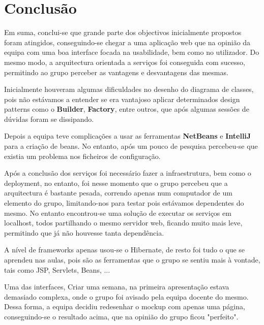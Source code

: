 \chapter{Conclusão}
\label{chap:conclusao}

\hspace{5mm} Em suma, conclui-se que grande parte dos objectivos inicialmente propostos foram atingidos, conseguindo-se chegar a uma aplicação web que na opinião da equipa com uma boa interface focada na usabilidade, bem como no utilizador. Do mesmo modo, a arquitectura orientada a serviços foi conseguida com sucesso, permitindo ao grupo perceber as vantagens e desvantagens das mesmas.

\hspace{5mm} Inicialmente houveram algumas dificuldades no desenho do diagrama de classes, pois não estávamos a entender se era vantajoso aplicar determinados design patterns como o \textbf{Builder}, \textbf{Factory}, entre outros, que após algumas sessões de dúvidas foram se dissipando.

\hspace{5mm} Depois a equipa teve complicações a usar as ferramentas \textbf{NetBeans} e \textbf{IntelliJ} para a criação de beans. No entanto, após um pouco de pesquisa percebeu-se que existia um problema nos ficheiros de configuração.

\hspace{5mm} Após a conclusão dos serviços foi necessário fazer a infraestrutura, bem como o deployment, no entanto, foi nesse momento que o grupo percebeu que a arquitectura é bastante pesada, correndo apenas num computador de um elemento do grupo, limitando-nos para testar pois estávamos dependentes do mesmo. No entanto encontrou-se uma solução de executar os serviços em localhost, todos partilhando o mesmo servidor web, ficando muito mais leve, permitindo que já não houvesse tanta dependência.

\hspace{5mm} A nível de frameworks apenas usou-se o Hibernate, de resto foi tudo o que se aprendeu nas aulas, pois são as ferramentas que o grupo se sentiu mais à vontade, tais como JSP, Servlets, Beans, ...

\hspace{5mm} Uma das interfaces, Criar uma semana, na primeira apresentação estava demasiado complexa, onde o grupo foi avisado pela equipa docente do mesmo. Dessa forma, a equipa decidiu redesenhar o mockup com apenas uma página, conseguindo-se o resultado acima, que na opinião do grupo ficou "perfeito".

